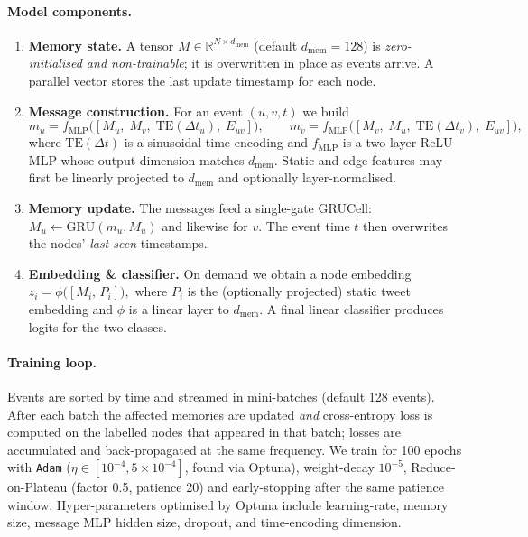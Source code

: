 \documentclass{cshonours}
\begin{document}
\paragraph{Model components.}
\begin{enumerate}
    \item \textbf{Memory state.}  
          A tensor $M\!\in\!\mathbb{R}^{N\times d_\text{mem}}$ (default $d_\text{mem}=128$) is \emph{zero-initialised and non-trainable}; it is overwritten in place as events arrive.  
          A parallel vector stores the last update timestamp for each node.
    \item \textbf{Message construction.}  
          For an event $(u,v,t)$ we build
          \[
              m_{u}=f_{\text{MLP}}\!\bigl([M_u,\;M_v,\;\text{TE}(\Delta t_u),\;E_{uv}]\bigr),\qquad
              m_{v}=f_{\text{MLP}}\!\bigl([M_v,\;M_u,\;\text{TE}(\Delta t_v),\;E_{uv}]\bigr),
          \]
          where $\text{TE}(\Delta t)$ is a sinusoidal time encoding and $f_{\text{MLP}}$ is a two-layer $\text{ReLU}$ MLP whose output dimension matches $d_\text{mem}$.  
          Static and edge features may first be linearly projected to $d_\text{mem}$ and optionally layer-normalised.
    \item \textbf{Memory update.}  
          The messages feed a single-gate GRUCell:
          $M_u\leftarrow\text{GRU}(m_{u},M_u)$ and likewise for $v$.  
          The event time \(t\) then overwrites the nodes' \emph{last-seen} timestamps.
    \item \textbf{Embedding \& classifier.}  
          On demand we obtain a node embedding
          \(
              z_i = \phi\!\bigl([M_i,\,P_i]\bigr),
          \)
          where \(P_i\) is the (optionally projected) static tweet embedding and
          $\phi$ is a linear layer to $d_\text{mem}$.  
          A final linear classifier produces logits for the two classes.
\end{enumerate}

\paragraph{Training loop.}
Events are sorted by time and streamed in mini-batches (default 128 events).  
After each batch the affected memories are updated \emph{and} cross-entropy loss is computed on the labelled nodes that appeared in that batch; losses are accumulated and back-propagated at the same frequency.  
We train for 100 epochs with \texttt{Adam} ($\eta\in[10^{-4},5\!\times\!10^{-4}]$, found via Optuna), weight-decay $10^{-5}$, Reduce-on-Plateau (factor 0.5, patience 20) and early-stopping after the same patience window.  
Hyper-parameters optimised by Optuna include learning-rate, memory size, message MLP hidden size, dropout, and time-encoding dimension.
\end{document}
